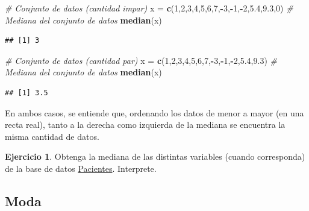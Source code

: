 \documentclass[
  11pt,
]{book}
\newenvironment{Shaded}{\begin{snugshade}}{\end{snugshade}}
\newcommand{\CommentTok}[1]{\textcolor[rgb]{0.56,0.35,0.01}{\textit{#1}}}
\newcommand{\DecValTok}[1]{\textcolor[rgb]{0.00,0.00,0.81}{#1}}
\newcommand{\FloatTok}[1]{\textcolor[rgb]{0.00,0.00,0.81}{#1}}
\newcommand{\FunctionTok}[1]{\textcolor[rgb]{0.13,0.29,0.53}{\textbf{#1}}}
\newcommand{\NormalTok}[1]{#1}
\newcommand{\OtherTok}[1]{\textcolor[rgb]{0.56,0.35,0.01}{#1}}
\newcommand{\SpecialCharTok}[1]{\textcolor[rgb]{0.81,0.36,0.00}{\textbf{#1}}}
\theoremstyle{definition}
\theoremstyle{definition}
\theoremstyle{definition}
\newtheorem{exercise}{Ejercicio}[chapter]
\theoremstyle{definition}
\theoremstyle{remark}
\begin{document}
\begin{Shaded}
\begin{Highlighting}[]
\CommentTok{\# Conjunto de datos (cantidad impar)}
\NormalTok{x }\OtherTok{=} \FunctionTok{c}\NormalTok{(}\DecValTok{1}\NormalTok{,}\DecValTok{2}\NormalTok{,}\DecValTok{3}\NormalTok{,}\DecValTok{4}\NormalTok{,}\DecValTok{5}\NormalTok{,}\DecValTok{6}\NormalTok{,}\DecValTok{7}\NormalTok{,}\SpecialCharTok{{-}}\DecValTok{3}\NormalTok{,}\SpecialCharTok{{-}}\DecValTok{1}\NormalTok{,}\SpecialCharTok{{-}}\DecValTok{2}\NormalTok{,}\FloatTok{5.4}\NormalTok{,}\FloatTok{9.3}\NormalTok{,}\DecValTok{0}\NormalTok{)}
\CommentTok{\# Mediana del conjunto de datos}
\FunctionTok{median}\NormalTok{(x)}
\end{Highlighting}
\end{Shaded}

\begin{verbatim}
## [1] 3
\end{verbatim}

\begin{Shaded}
\begin{Highlighting}[]
\CommentTok{\# Conjunto de datos (cantidad par)}
\NormalTok{x }\OtherTok{=} \FunctionTok{c}\NormalTok{(}\DecValTok{1}\NormalTok{,}\DecValTok{2}\NormalTok{,}\DecValTok{3}\NormalTok{,}\DecValTok{4}\NormalTok{,}\DecValTok{5}\NormalTok{,}\DecValTok{6}\NormalTok{,}\DecValTok{7}\NormalTok{,}\SpecialCharTok{{-}}\DecValTok{3}\NormalTok{,}\SpecialCharTok{{-}}\DecValTok{1}\NormalTok{,}\SpecialCharTok{{-}}\DecValTok{2}\NormalTok{,}\FloatTok{5.4}\NormalTok{,}\FloatTok{9.3}\NormalTok{)}
\CommentTok{\# Mediana del conjunto de datos}
\FunctionTok{median}\NormalTok{(x)}
\end{Highlighting}
\end{Shaded}

\begin{verbatim}
## [1] 3.5
\end{verbatim}

En ambos casos, se entiende que, ordenando los datos de menor a mayor (en una recta real), tanto a la derecha como izquierda de la mediana se encuentra la misma cantidad de datos.

\begin{exercise}
Obtenga la mediana de las distintas variables (cuando corresponda) de la base de datos \hyperref[Pacientes]{Pacientes}. Interprete.
\end{exercise}

\subsection{Moda}\label{moda}
\end{document}
